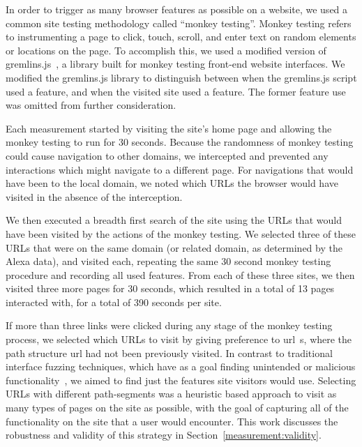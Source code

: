 In order to trigger as many browser features as possible on a website, we used
a common site testing methodology called ``monkey testing''.  Monkey testing
refers to instrumenting a page to click, touch, scroll, and enter text on
random elements or locations on the page.  To accomplish this, we used a
modified version of gremlins.js~\cite{zaninotto2016gremlins}, a library built
for monkey testing front-end website interfaces.  We modified the gremlins.js
library to distinguish between when the gremlins.js script used a
feature, and when the visited site used a feature.  The former feature
use was omitted from further consideration.

Each measurement started by visiting the site's home page and allowing
the monkey testing to run for 30 seconds.  Because the randomness of monkey
testing could cause navigation to other domains, we intercepted and prevented
any interactions which might navigate to a different page.  For
navigations that would have been to the local domain, we noted which URLs the
browser would have visited in the absence of the interception.

We then executed a breadth first search of the site using the
URLs that would have been visited by the actions of the monkey
testing.  We selected three of these URLs that were on the same domain (or
related domain, as determined by the Alexa data), and visited each, repeating
the same 30 second monkey testing procedure and recording all used features.
From each of these three sites, we then visited three more pages for 30 seconds,
which resulted in a total of 13 pages interacted with, for a total of 390
seconds per site.

If more than three links were clicked during any stage of the monkey testing
process, we selected which URLs to visit by giving preference to \gls{url}~s,
where the path structure \gls{url} had not been previously visited. In contrast
to traditional interface fuzzing techniques, which have as a goal finding
unintended or malicious functionality~\cite{amalfitano2012using,liu2014decaf},
we aimed to find just the features site visitors would use. Selecting URLs with
different path-segments was a heuristic based approach to visit as many types
of pages on the site as possible, with the goal of capturing all of the
functionality on the site that a user would encounter.  This work discusses the
robustness and validity of this strategy in Section~\ref{measurement:validity}.


